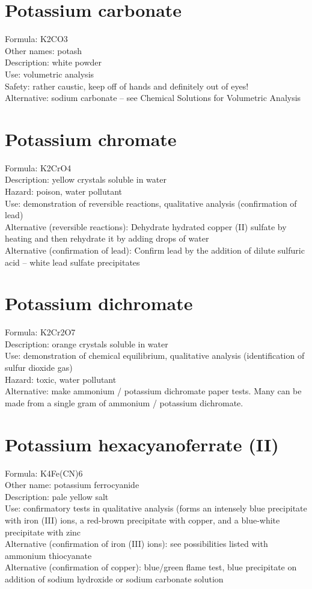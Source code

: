 \section{Potassium carbonate}
Formula: K2CO3\\
Other names: potash\\
Description: white powder\\
Use: volumetric analysis\\
Safety: rather caustic, keep off of hands and definitely out of eyes!\\
Alternative: sodium carbonate – 
see Chemical Solutions for Volumetric Analysis

\section{Potassium chromate}
Formula: K2CrO4\\
Description: yellow crystals soluble in water\\
Hazard: poison, 
water pollutant\\
Use: demonstration of reversible reactions, 
qualitative analysis (confirmation of lead)\\
Alternative (reversible reactions):
Dehydrate hydrated copper (II) sulfate by heating 
and then rehydrate it by adding drops of water\\
Alternative (confirmation of lead): 
Confirm lead by the addition of dilute sulfuric acid – 
white lead sulfate precipitates

\section{Potassium dichromate}
Formula: K2Cr2O7\\
Description: orange crystals soluble in water\\
Use: demonstration of chemical equilibrium, 
qualitative analysis (identification of sulfur dioxide gas)\\
Hazard: toxic, 
water pollutant\\
Alternative: make ammonium / potassium dichromate paper tests. 
Many can be made from a single gram of ammonium / potassium dichromate.

\section{Potassium hexacyanoferrate (II)}
Formula: K4Fe(CN)6\\
Other name: potassium ferrocyanide\\
Description: pale yellow salt\\
Use: confirmatory tests in qualitative analysis 
(forms an intensely blue precipitate with iron (III) ions, 
a red-brown precipitate with copper, 
and a blue-white precipitate with zinc\\
Alternative (confirmation of iron (III) ions): 
see possibilities listed with ammonium thiocyanate\\
Alternative (confirmation of copper): blue/green flame test, 
blue precipitate on addition of sodium hydroxide 
or sodium carbonate solution

